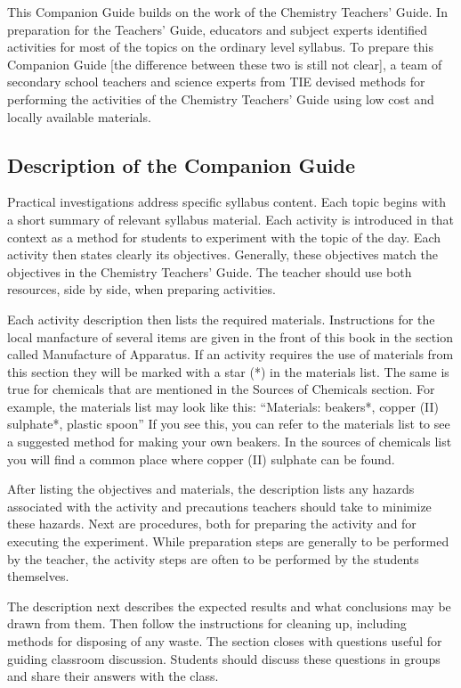 This Companion Guide builds on the work of the Chemistry Teachers' Guide. In preparation for the Teachers' Guide, educators and subject experts identified activities for most of the topics on the ordinary level syllabus. To prepare this Companion Guide [the difference between these two is still not clear], a team of secondary school teachers and science experts from TIE devised methods for performing the activities of the Chemistry Teachers' Guide using low cost and locally available materials.

\subsection*{Description of the Companion Guide}

Practical investigations address specific syllabus content. Each topic begins with a short summary of relevant syllabus material. Each activity is introduced in that context as a method for students to experiment with the topic of the day. Each activity then states clearly its objectives. Generally, these objectives match the objectives in the Chemistry Teachers' Guide. The teacher should use both resources, side by side, when preparing activities.

Each activity description then lists the required materials. Instructions for the local manfacture of several items are given in the front of this book in the section called Manufacture of Apparatus. If an activity requires the use of materials from this section they will be marked with a star (*) in the materials list. The same is true for chemicals that are mentioned in the Sources of Chemicals section. For example, the materials list may look like this:
``Materials: beakers*, copper (II) sulphate*, plastic spoon''
If you see this, you can refer to the materials list to see a suggested method for making your own beakers. In the sources of chemicals list you will find a common place where copper (II) sulphate can be found. 

After listing the objectives and materials, the description lists any hazards associated with the activity and precautions teachers should take to minimize these hazards. Next are procedures, both for preparing the activity and for executing the experiment. While preparation steps are generally to be performed by the teacher, the activity steps are often to be performed by the students themselves.

The description next describes the expected results and what conclusions may be drawn from them. Then follow the instructions for cleaning up, including methods for disposing of any waste. The section closes with questions useful for guiding classroom discussion. Students should discuss these questions in groups and share their answers with the class.

